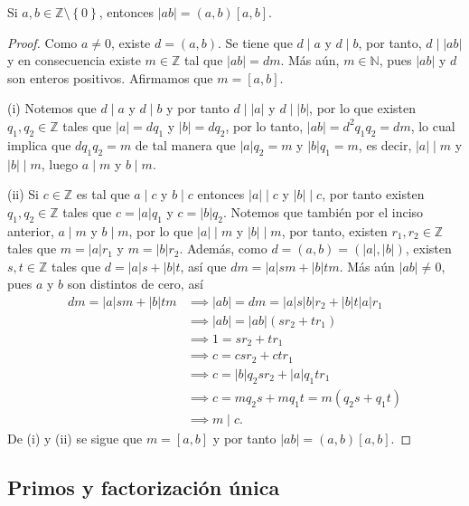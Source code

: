 \begin{theorem}
Si $a,b\in \mathbb{Z}\setminus \left\{0\right\}$, entonces $|a b|=(a,b)[a,b]$.
\end{theorem}
\begin{proof}
Como $a\neq 0$, existe $d=(a,b)$. Se tiene que $d \mid a$ y $d \mid b$, por tanto, $d \mid |ab|$ y en consecuencia existe $m\in \mathbb{Z}$ tal que $|ab|=dm$. Más aún, $m\in \mathbb{N}$, pues $|a b|$ y $d$ son enteros positivos. Afirmamos que $m=[a,b]$.
\bigskip

(i) Notemos que $d \mid a$ y $d \mid b$ y por tanto $d \mid |a|$ y $d \mid |b|$, por lo que existen $q_{1},q_{2}\in \mathbb{Z}$ tales que $|a|=dq_{1}$ y $|b|=dq_{2}$, por lo tanto, $|a b|=d^{2}q_{1}q_{2}=dm$, lo cual implica que $dq_{1}q_{2}=m$ de tal manera que $|a|q_{2}=m$ y $|b|q_{1}=m$, es decir, $|a| \mid m$ y $|b| \mid m$, luego $a \mid m$ y $b \mid m$.
\bigskip

(ii) Si $c\in \mathbb{Z}$ es tal que $a \mid c$ y $b \mid c$ entonces  $|a|\mid c$ y $|b|\mid c$, por tanto existen $q_{1},q_{2}\in \mathbb{Z}$ tales que $c=|a|q_{1}$ y $c=|b|q_{2}$. Notemos que también por el inciso anterior, $a \mid m$ y $b \mid m$, por lo que $|a|\mid m$ y $|b| \mid m$, por tanto, existen $r_{1},r_{2}\in \mathbb{Z}$ tales que $m=|a|r_{1}$ y $m=|b|r_{2}$. Además, como $d=(a,b)=(|a|,|b|)$, existen $s,t\in \mathbb{Z}$ tales que $d=|a| s+|b| t$, así que $d m=|a| s m+|b| t m$. Más aún $|a b|\neq 0$, pues $a$ y $b$ son distintos de cero, así
\begin{align*}
	d m=|a| s m+|b| t m &\implies |a b| = d m=|a| s |b| r_{2}+|b| t |a| r_{1} \\
					&\implies |a b|=|a b|(sr_{2}+tr_{1}) \\
					&\implies 1=s r_{2}+t r_{1} \\
					&\implies c=c s r_{2}+c t r_{1} \\
					&\implies c=|b| q_{2}s r_{2}+|a| q_{1} t r_{1} \\
					&\implies c=m q_{2} s+m q_{1}t=m(q_{2}s+q_{1}t) \\
					&\implies m \mid c.
\end{align*}
De (i) y (ii) se sigue que $m=[a,b]$ y por tanto $|a b|=(a,b)[a,b]$.
\end{proof}

\subsection{Primos y factorización única}


